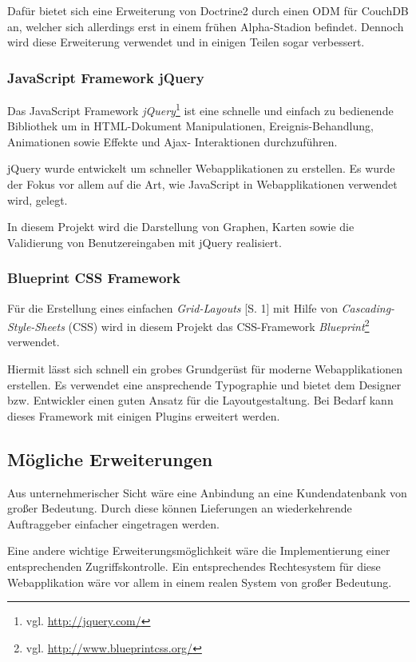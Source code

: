 Dafür bietet sich eine Erweiterung von Doctrine2 durch einen ODM für CouchDB
	an, welcher sich allerdings erst in einem frühen Alpha-Stadion befindet.
	Dennoch wird diese Erweiterung verwendet und in einigen Teilen sogar
	verbessert.

\subsubsection{JavaScript Framework jQuery}
Das JavaScript Framework \emph{jQuery}\footnote{vgl. \url{http://jquery.com/}}
	ist eine schnelle und einfach zu bedienende Bibliothek um in HTML-Dokument
	Manipulationen,	Ereignis-Behandlung, Animationen sowie Effekte und Ajax-
	Interaktionen durchzuführen.
	
jQuery wurde entwickelt um schneller Webapplikationen zu erstellen. Es wurde der
	Fokus vor allem auf die Art, wie JavaScript in Webapplikationen verwendet wird,
	gelegt.
	
In diesem Projekt wird die Darstellung von Graphen, Karten sowie die Validierung von
	Benutzereingaben mit jQuery realisiert.

\subsubsection{Blueprint CSS Framework}
Für die Erstellung eines einfachen \emph{Grid-Layouts} \cite{W3C11}[S. 1] mit Hilfe von
	\emph{Cascading-Style-Sheets} (CSS) wird in diesem Projekt das CSS-Framework
	\emph{Blueprint}\footnote{vgl. \url{http://www.blueprintcss.org/}} verwendet.
	
Hiermit lässt sich schnell ein grobes Grundgerüst für moderne Webapplikationen
	erstellen. Es verwendet eine ansprechende Typographie und bietet dem Designer
	bzw. Entwickler einen guten Ansatz für die Layoutgestaltung. Bei Bedarf kann
	dieses Framework mit einigen Plugins erweitert werden.

\subsection{Mögliche Erweiterungen}

Aus unternehmerischer Sicht wäre eine Anbindung an eine Kundendatenbank von
	großer Bedeutung. Durch diese können Lieferungen an wiederkehrende Auftraggeber
	einfacher eingetragen werden.
	
Eine andere wichtige Erweiterungsmöglichkeit wäre die Implementierung einer
	entsprechenden Zugriffskontrolle. Ein entsprechendes Rechtesystem für diese
	Webapplikation wäre vor allem in einem realen System von großer Bedeutung.

